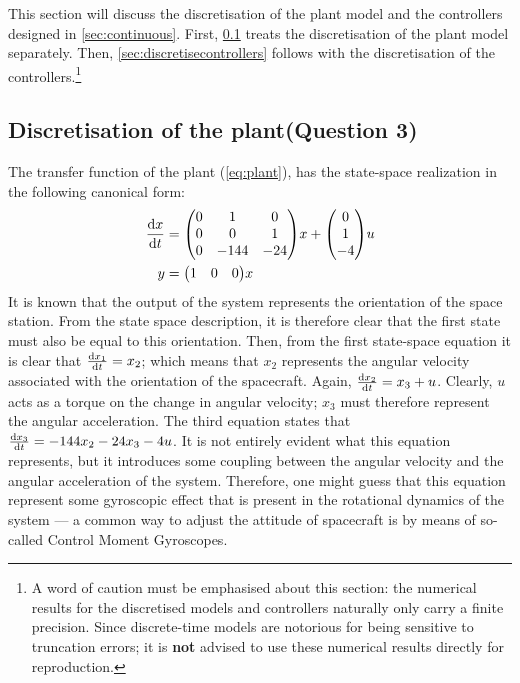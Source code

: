 This section will discuss the discretisation of the plant model and the controllers designed in \cref{sec:continuous}. First, \cref{sec:plantdiscretisation} treats the discretisation of the plant model separately. Then, \cref{sec:discretisecontrollers} follows with the discretisation of the controllers.\footnote{A word of caution must be emphasised about this section: the numerical results for the discretised models and controllers naturally only carry a finite precision. Since discrete-time models are notorious for being sensitive to truncation errors; it is \textbf{not} advised to use these numerical results directly for reproduction.}

\subsection{Discretisation of the plant\textnormal{\phantom{xxx}(Question 3)}}
\label{sec:plantdiscretisation}
The transfer function of the plant (\cref{eq:plant}), has the state-space realization in the following canonical form:
\begin{equation}
    \begin{aligned}
        \dv{x}{t} &= \mqty(0 & 1 & 0 \\ 0 & 0 & 1 \\ 0 & -144 & -24)x + \mqty(0 \\ 1 \\ -4)u\\
        y &= \mqty(1 & 0 & 0)x
    \end{aligned}
\end{equation}
It is known that the output of the system represents the orientation of the space station. From the state space description, it is therefore clear that the first state must also be equal to this orientation. Then, from the first state-space equation it is clear that $\dv{x_1}{t} = x_2$; which means that $x_2$ represents the angular velocity associated with the orientation of the spacecraft. Again, $\dv{x_2}{t} = x_3 + u$. Clearly, $u$ acts as a torque on the change in angular velocity; $x_3$ must therefore represent the angular acceleration. The third equation states that $\dv{x_3}{t} = -144x_2 - 24x_3 -4u$. It is not entirely evident what this equation represents, but it introduces some coupling between the angular velocity and the angular acceleration of the system. Therefore, one might guess that this equation represent some gyroscopic effect that is present in the rotational dynamics of the system --- a common way to adjust the attitude of spacecraft is by means of so-called Control Moment Gyroscopes.

